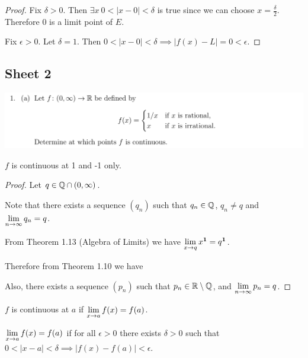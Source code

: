 \begin{proof}
  Fix $\delta > 0$. Then $\exists x ~ 0 < |x - 0| < \delta$ is true since we can choose
  $x = \frac{\delta}{2}$. Therefore 0 is a limit point of $E$.

  Fix $\epsilon > 0$. Let $\delta = 1$. Then
  $0 < |x - 0| < \delta \implies |f(x) - L| = 0 < \epsilon$.
\end{proof}

\newpage
\subsection{Sheet 2}

\begin{mdframed}
  \includegraphics[width=400pt]{img/oxford-prelims-M2-analysis-II-sheet-2-1a.png}
\end{mdframed}

\begin{theorem*}
  $f$ is continuous at 1 and -1 only.
\end{theorem*}

\begin{proof} Let $q \in \Q \cap (0, \infty)$.

  Note that there exists a sequence $(q_n)$ such that $q_n \in \Q$, $q_n \neq q$ and
  $\LimEq{q_n}{q}{n}{\infty}$.

  From Theorem 1.13 (Algebra of Limits) we have $\Lim{x^\1}{x}{q} = q^\1$.

  Therefore from Theorem 1.10 we have


  Also, there exists a sequence $(p_n)$ such that $p_n \in \R\setminus\Q$, and
  $\LimEq{p_n}{q}{n}{\infty}$.


\end{proof}

\begin{definition*}[continuity]
  $f$ is continuous at $a$ if $\LimEq{f(x)}{f(a)}{x}{a}$.
\end{definition*}

\begin{definition*}[limit]
  $\LimEq{f(x)}{f(a)}{x}{a}$ if for all $\epsilon > 0$ there exists $\delta > 0$ such that
  $0 < |x - a| < \delta \implies |f(x) - f(a)| < \epsilon$.
\end{definition*}

